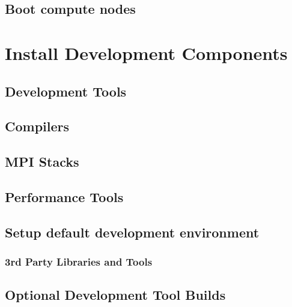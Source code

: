 \documentclass{ohpc-doc}
\begin{document}
\section{Boot compute nodes} \label{sec:boot_computes}


\chapter{Install \OHPC{} Development Components}


\section{Development Tools} \label{sec:install_dev_tools}


\section{Compilers} \label{sec:install_compilers}


\section{MPI Stacks} \label{sec:mpi}


\section{Performance Tools} \label{sec:install_perf_tools}


\section{Setup default development environment}


\subsection{3rd Party Libraries and Tools} \label{sec:3rdparty}





\section{Optional Development Tool Builds} \label{sec:3rdparty_intel}

\end{document}
